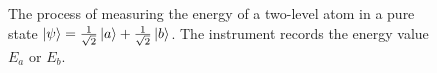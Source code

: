 \begin{figure}
\centering



\caption{The process of measuring the energy of a two-level atom in a
pure state $\left|\psi\right> = 
\frac{1}{\sqrt{2}}\ket{a} + \frac{1}{\sqrt{2}}\ket{b}$.
The instrument records the energy value $E_a$ or $E_b$.
}
\label{fig:add:mesure_ex}
\end{figure}